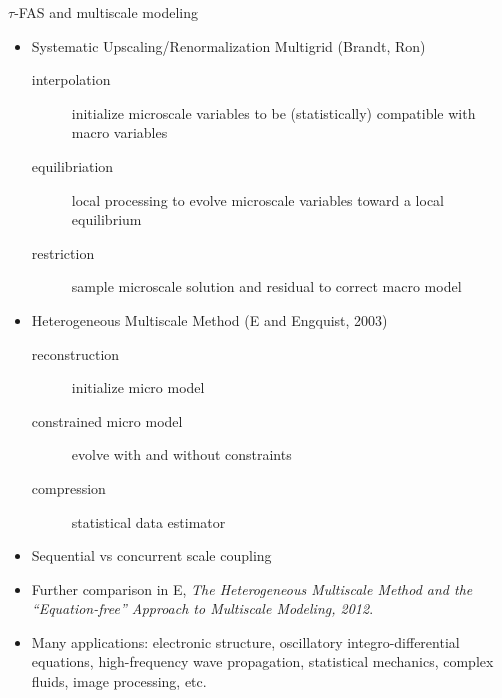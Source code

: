 \begin{frame}{$\tau$-FAS and multiscale modeling}
  \begin{itemize}
  \item Systematic Upscaling/Renormalization Multigrid (Brandt, Ron)
    \begin{description}
    \item[interpolation] initialize microscale variables to be (statistically) compatible with macro variables
    \item[equilibriation] local processing to evolve microscale variables toward a local equilibrium
    \item[restriction] sample microscale solution and residual to correct macro model
    \end{description}
  \item Heterogeneous Multiscale Method (E and Engquist, 2003)
    \begin{description}
    \item[reconstruction] initialize micro model
    \item[constrained micro model] evolve with and without constraints
    \item[compression] statistical data estimator
    \end{description}
  \item Sequential vs concurrent scale coupling
  \item Further comparison in E, \textit{The Heterogeneous Multiscale Method and the ``Equation-free'' Approach to Multiscale Modeling, 2012}.
  \item Many applications: electronic structure, oscillatory integro-differential equations, high-frequency wave propagation, statistical mechanics, complex fluids, image processing, etc.
  \end{itemize}
\end{frame}
